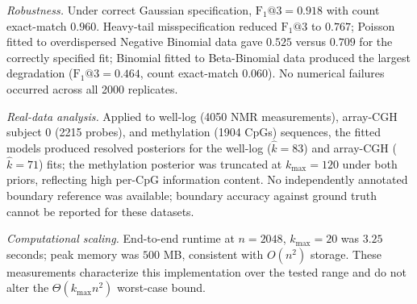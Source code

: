 \textit{Robustness.} Under correct Gaussian specification, $\mathrm{F_1}@3 = 0.918$ with count exact-match $0.960$. Heavy-tail misspecification reduced $\mathrm{F_1}@3$ to $0.767$; Poisson fitted to overdispersed Negative Binomial data gave $0.525$ versus $0.709$ for the correctly specified fit; Binomial fitted to Beta-Binomial data produced the largest degradation ($\mathrm{F_1}@3 = 0.464$, count exact-match $0.060$). No numerical failures occurred across all 2000 replicates.

\textit{Real-data analysis.} Applied to well-log (4050 NMR measurements), array-CGH subject 0 (2215 probes), and methylation (1904 CpGs) sequences, the fitted models produced resolved posteriors for the well-log ($\hat{k}=83$) and array-CGH ($\hat{k}=71$) fits; the methylation posterior was truncated at $k_{\max}=120$ under both priors, reflecting high per-CpG information content. No independently annotated boundary reference was available; boundary accuracy against ground truth cannot be reported for these datasets.

\textit{Computational scaling.} End-to-end runtime at $n=2048$, $k_{\max}=20$ was $3.25$ seconds; peak memory was $500$ MB, consistent with $O(n^2)$ storage. These measurements characterize this implementation over the tested range and do not alter the $\Theta(k_{\max}n^2)$ worst-case bound.
